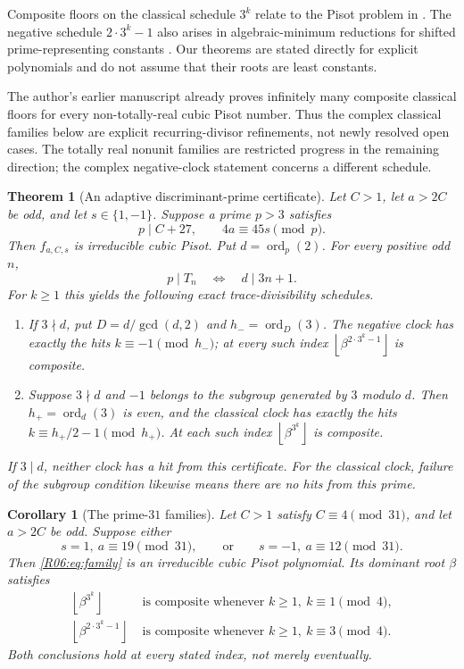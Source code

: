 \documentclass[11pt,a4paper]{article}
\newtheorem{corollary}[theorem]{Corollary}\newtheorem{mainthm}[theorem]{Theorem}
\theoremstyle{definition}\newtheorem{definition}[theorem]{Definition}
\theoremstyle{remark}\newtheorem{remark}[theorem]{Remark}
\newcommand{\floor}[1]{\left\lfloor#1\right\rfloor}
\begin{document}
Composite floors on the classical schedule $3^k$ relate to the
Pisot problem in \cite[Problem~1.1]{SaitoIntervals}.
The negative schedule $2\cdot3^k-1$ also arises in algebraic-minimum
reductions for shifted prime-representing constants
\cite{Saito,N01}. Our theorems are stated directly for explicit
polynomials and do not assume that their roots are least constants.

The author's earlier manuscript \cite[theorem ``Nonreal cubic
conjugates'']{K031} already proves infinitely many composite classical
floors for every non-totally-real cubic Pisot number. Thus the complex
classical families below are explicit recurring-divisor refinements,
not newly resolved open cases. The totally real nonunit families are
restricted progress in the remaining direction; the complex
negative-clock statement concerns a different schedule.

\begin{mainthm}[An adaptive discriminant-prime certificate]
\label{R06:thm:adaptive}
Let $C>1$, let $a>2C$ be odd, and let $s\in\{1,-1\}$.
Suppose a prime $p>3$ satisfies
\[
 p\mid C+27,\qquad 4a\equiv45s\pmod p.
\]
Then $f_{a,C,s}$ is irreducible cubic Pisot. Put $d=\operatorname{ord}_p(2)$.
For every positive odd $n$,
\[
 p\mid T_n\quad\Longleftrightarrow\quad d\mid3n+1.
\]
For $k\ge1$ this yields the following exact trace-divisibility schedules.
\begin{enumerate}[label=\textup{(\roman*)}]
\item If $3\nmid d$, put $D=d/\gcd(d,2)$ and
$h_-=\operatorname{ord}_{D}(3)$. The negative clock has exactly the
hits $k\equiv-1\pmod{h_-}$; at every such index
$\floor{\beta^{2\cdot3^k-1}}$ is composite.
\item Suppose $3\nmid d$ and $-1$ belongs to the subgroup generated
by $3$ modulo $d$. Then $h_+=\operatorname{ord}_{d}(3)$ is even,
and the classical clock has exactly the hits
$k\equiv h_+/2-1\pmod{h_+}$. At each such index
$\floor{\beta^{3^k}}$ is composite.
\end{enumerate}
If $3\mid d$, neither clock has a hit from this certificate.
For the classical clock, failure of the subgroup condition likewise
means there are no hits from this prime.
\end{mainthm}

\begin{corollary}[The prime-$31$ families]\label{R06:thm:31main}
Let $C>1$ satisfy $C\equiv4\pmod{31}$, and let $a>2C$ be odd.
Suppose either
\[
 s=1,\ a\equiv19\pmod{31},\qquad\text{or}\qquad
 s=-1,\ a\equiv12\pmod{31}.
\]
Then \eqref{R06:eq:family} is an irreducible cubic Pisot polynomial.
Its dominant root $\beta$ satisfies
\begin{align*}
 \floor{\beta^{3^k}}&\text{ is composite whenever }k\ge1,
       \ k\equiv1\pmod4,\\
 \floor{\beta^{2\cdot3^k-1}}&\text{ is composite whenever }k\ge1,
       \ k\equiv3\pmod4.
\end{align*}
Both conclusions hold at every stated index, not merely eventually.
\end{corollary}
\end{document}
